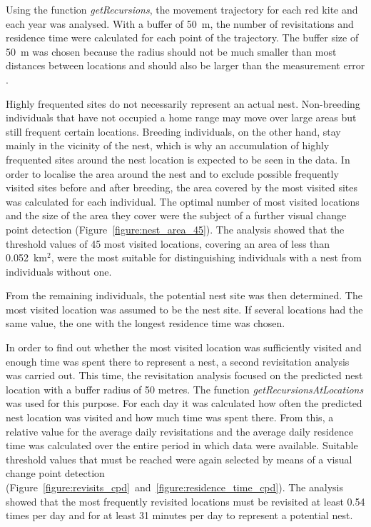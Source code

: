 Using the function \textit{getRecursions}, the movement trajectory for each red kite and each year was analysed. With a buffer of 50~m, the number of revisitations and residence time were calculated for each point of the trajectory. The buffer size of 50~m was chosen because the radius should not be much smaller than most distances between locations and should also be larger than the measurement error \parencite{bracis2018revisit}.

Highly frequented sites do not necessarily represent an actual nest. Non-breeding individuals that have not occupied a home range may move over large areas but still frequent certain locations. Breeding individuals, on the other hand, stay mainly in the vicinity of the nest, which is why an accumulation of highly frequented sites around the nest location is expected to be seen in the data. In order to localise the area around the nest and to exclude possible frequently visited sites before and after breeding, the area covered by the most visited sites was calculated for each individual. The optimal number of most visited locations and the size of the area they cover were the subject of a further visual change point detection (Figure~\ref{figure:nest_area_45}). The analysis showed that the threshold values of 45 most visited locations, covering an area of less than 0.052~km$^2$, were the most suitable for distinguishing individuals with a nest from individuals without one.

From the remaining individuals, the potential nest site was then determined. The most visited location was assumed to be the nest site. If several locations had the same value, the one with the longest residence time was chosen.

In order to find out whether the most visited location was sufficiently visited and enough time was spent there to represent a nest, a second revisitation analysis was carried out. This time, the revisitation analysis focused on the predicted nest location with a buffer radius of 50 metres. The function \textit{getRecursionsAtLocations} was used for this purpose. For each day it was calculated how often the predicted nest location was visited and how much time was spent there. From this, a relative value for the average daily revisitations and the average daily residence time was calculated over the entire period in which data were available. Suitable threshold values that must be reached were again selected by means of a visual change point detection (Figure~\ref{figure:revisits_cpd}~and~\ref{figure:residence_time_cpd}). The analysis showed that the most frequently revisited locations must be revisited at least 0.54 times per day and for at least 31 minutes per day to represent a potential nest.

